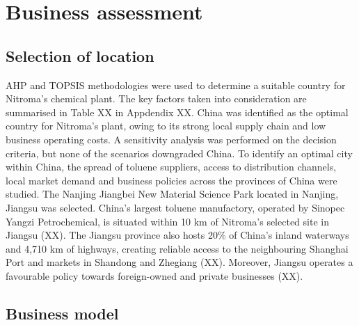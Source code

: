 \section{Business assessment}
\label{sec:economics}
\subsection{Selection of location} 
AHP and TOPSIS methodologies were used to determine a suitable country for Nitroma’s chemical plant. The key factors taken into consideration are summarised in Table XX in Appdendix XX. China was identified as the optimal country for Nitroma's plant, owing to its strong local supply chain and low business operating costs. A sensitivity analysis was performed on the decision criteria, but none of the scenarios downgraded China. To identify an optimal city within China, the spread of toluene suppliers, access to distribution channels, local market demand and business policies across the provinces of China were studied. The Nanjing Jiangbei New Material Science Park located in Nanjing, Jiangsu was selected. China’s largest toluene manufactory, operated by Sinopec Yangzi Petrochemical, is situated within 10 km of Nitroma’s selected site in Jiangsu (XX). The Jiangsu province also hosts 20\% of China’s inland waterways and 4,710 km of highways, creating reliable access to the neighbouring Shanghai Port and markets in Shandong and Zhegiang (XX). Moreover, Jiangsu operates a favourable policy towards foreign-owned and private businesses (XX). 

\subsection{Business model} 
